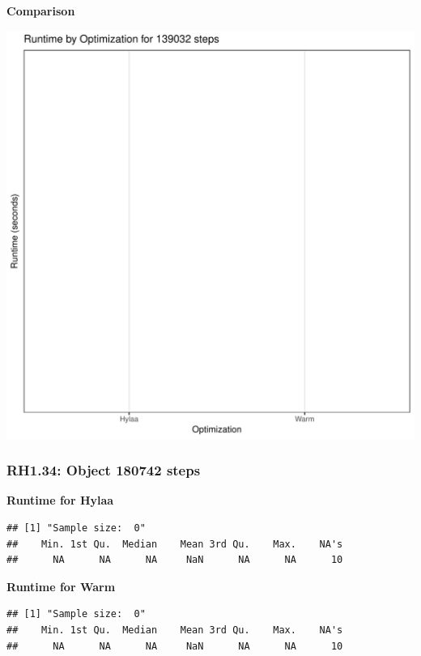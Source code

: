 \documentclass{article}\usepackage[]{graphicx}\usepackage[]{color}
\makeatletter
\def\maxwidth{ %
  \ifdim\Gin@nat@width>\linewidth
    \linewidth
  \else
    \Gin@nat@width
  \fi
}
\newenvironment{kframe}{%
 \def\at@end@of@kframe{}%
 \ifinner\ifhmode%
  \def\at@end@of@kframe{\end{minipage}}%
  \begin{minipage}{\columnwidth}%
 \fi\fi%
 \def\FrameCommand##1{\hskip\@totalleftmargin \hskip-\fboxsep
 \colorbox{shadecolor}{##1}\hskip-\fboxsep
     \hskip-\linewidth \hskip-\@totalleftmargin \hskip\columnwidth}%
 \MakeFramed {\advance\hsize-\width
   \@totalleftmargin\z@ \linewidth\hsize
   \@setminipage}}%
 {\par\unskip\endMakeFramed%
 \at@end@of@kframe}
\newenvironment{knitrout}{}{} %
\makeatother
\begin{document}
 \textbf{Comparison}
  
\begin{knitrout}
\color{fgcolor}
\includegraphics[width=\maxwidth]{figure/RH1_steps139032-1} 

\end{knitrout}


\subsubsection{RH1.34: Object 180742 steps}

 \textbf{Runtime for Hylaa}
\begin{knitrout}
\color{fgcolor}\begin{kframe}
\begin{verbatim}
## [1] "Sample size:  0"
##    Min. 1st Qu.  Median    Mean 3rd Qu.    Max.    NA's 
##      NA      NA      NA     NaN      NA      NA      10
\end{verbatim}
\end{kframe}
\end{knitrout}
 \textbf{Runtime for Warm}
\begin{knitrout}
\color{fgcolor}\begin{kframe}
\begin{verbatim}
## [1] "Sample size:  0"
##    Min. 1st Qu.  Median    Mean 3rd Qu.    Max.    NA's 
##      NA      NA      NA     NaN      NA      NA      10
\end{verbatim}
\end{kframe}
\end{knitrout}
  
\end{document}
